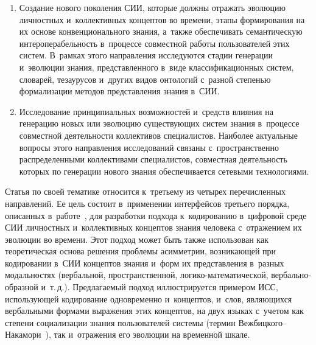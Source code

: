 \begin{multicols}{2}
\begin{enumerate}[1.]
  \item  Создание нового поколения СИИ, 
которые должны отражать эволюцию личностных и~коллективных концептов 
во времени, этапы формирования на их основе конвенционального знания, 
а~также обеспечивать семантическую интероперабельность в~процессе 
совместной работы пользователей этих систем. В~рамках этого направления 
исследуются стадии генерации и~эволюции знания, представленного в~виде 
классификационных систем, словарей, тезаурусов и~других видов онтологий 
с~разной степенью формализации методов представления знания в~СИИ.
  \item  Исследование принципиальных возможностей\linebreak
   и~средств влияния на 
генерацию новых или эволюцию существующих систем знания в~процессе 
совместной деятельности коллективов специалистов. Наиболее актуальные 
вопросы \mbox{этого} направления исследований связаны с~пространственно 
распределенными коллективами специалистов, совместная деятельность 
которых по генерации нового знания обеспечивается сетевыми технологиями.
  \end{enumerate}
  
  Статья по своей тематике относится к~третьему из четырех перечисленных 
направлений. Ее цель состоит в~применении интерфейсов третьего порядка, 
описанных в~работе~\cite{2-zac}, для разработки подхода к~кодированию 
в~цифровой среде СИИ личностных и~коллективных концептов знания 
человека с~отражением их эволюции во времени. Этот подход может быть 
также использован как теоретическая основа решения проблемы асимметрии, 
возникающей при кодировании в~СИИ концептов знания и~форм их 
представления в~разных модальностях (вербальной, пространственной,  
ло\-ги\-ко-ма\-те\-ма\-ти\-че\-ской, вер\-баль\-но-образ\-ной и~т.\,д.). 
Предлагаемый подход иллюстрируется примером ИСС, использующей кодирование одновременно и~концептов, и~слов, 
являющихся вербальными формами выражения этих концептов, на двух языках 
с~учетом как степени социализации знания пользователей сис\-те\-мы (термин 
Веж\-биц\-ко\-го--На\-ка\-мо\-ри~\cite{3-zac, 4-zac}), так и~отражения его 
эволюции на временн$\acute{\mbox{о}}$й шкале.

\begin{figure*} %
  \vspace*{1pt}
    \begin{center}  
  \mbox{%
 \epsfxsize=89.14mm 
 }
\end{center}
\vspace*{-9pt}
\end{figure*}


\end{multicols}
